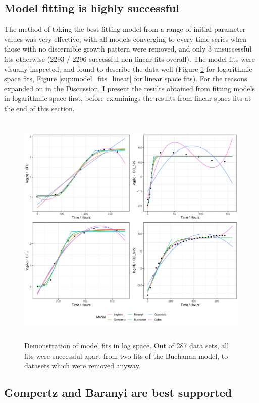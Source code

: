 \documentclass[11pt, a4paper]{article}
\begin{document}
\begin{linenumbers}
\subsection{Model fitting is highly successful}
The method of taking the best fitting model from a range of initial parameter values was very effective, with all models converging to every time series when those with no discernible growth pattern were removed, and only 3 unsuccessful fits otherwise (2293 / 2296 successful non-linear fits overall). The model fits were visually inspected, and found to describe the data well (Figure \ref{fig:model_fits} for logarithmic space fits, Figure \ref{sup:model_fits_linear} for linear space fits). For the reasons expanded on in the Discussion, I present the results obtained from fitting models in logarithmic space first, before examinings the results from linear space fits at the end of this section.

                \begin{figure}[H]
                \centering
        \includegraphics[height=4.5in]{../results/model_fits.pdf}
        \caption{Demonstration of model fits in log space. Out of 287 data sets, all fits were successful apart from two fits of the Buchanan model, to datasets which were removed anyway. }
        \label{fig:model_fits}
        \end{figure}

\subsection{Gompertz and Baranyi are best supported}


\end{linenumbers}
\end{document}
